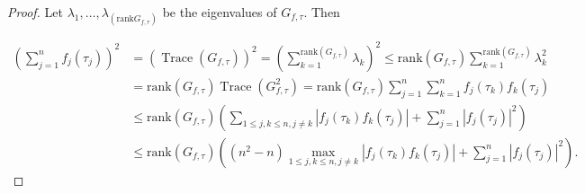 \documentclass{amsart}
\begin{document}
\begin{proof}
Let $\lambda_1, \dots, \lambda_{(\text{rank}G_{f,\tau})}$ be the  eigenvalues	of $G_{f,\tau}$. Then 

\begin{align*}
  \left(\sum_{j=1}^n
f_j(\tau_j)\right)^2&=	(\operatorname{Trace}(G_{f,\tau}))^2=\left(\sum_{k=1}^{\text{rank}(G_{f,\tau})}
\lambda_k\right)^2\leq {\text{rank}(G_{f,\tau})} \sum_{k=1}^{\text{rank}(G_{f,\tau})}
\lambda_k^2\\
&=\text{rank}(G_{f,\tau})\operatorname{Trace}(G^2_{f,\tau})=\text{rank}(G_{f,\tau})\sum_{j=1}^n\sum_{k=1}^nf_j(\tau_k)f_k(\tau_j)\\
&\leq \text{rank}(G_{f,\tau})\left(\sum_{1\leq j,k \leq n, j\neq k}|f_j(\tau_k)f_k(\tau_j)|+\sum_{j=1}^{n}|f_j(\tau_j)|^2\right)\\
&\leq \text{rank}(G_{f,\tau})\left((n^2-n)\max_{1\leq j,k \leq n, j\neq k}|f_j(\tau_k)f_k(\tau_j)|+\sum_{j=1}^{n}|f_j(\tau_j)|^2\right).
\end{align*}
\end{proof}
\end{document}
